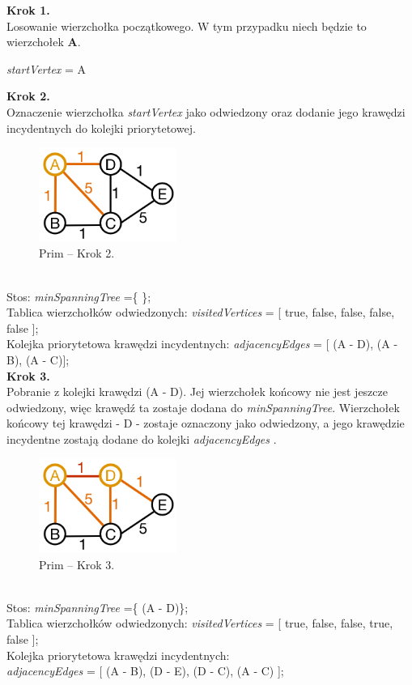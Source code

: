 \textbf{Krok 1.}\\
Losowanie wierzchołka początkowego. W tym przypadku niech będzie to wierzchołek \textbf{A}.
\begin{center}
	\emph{startVertex} = A
\end{center}

\textbf{Krok 2.}\\
Oznaczenie wierzchołka \emph{startVertex} jako odwiedzony oraz dodanie jego krawędzi incydentnych do kolejki priorytetowej. 
\begin{figure}[htb!]
	\centering
	\includegraphics[width=0.4\textwidth]{tex/fig/graf2}
	\caption{Prim -- Krok 2.}
	\label{fig: g2}
\end{figure}\\
Stos: \emph{minSpanningTree} =\{ \};\\
Tablica wierzchołków odwiedzonych: \emph{visitedVertices} = [ true, false, false, false, false ];\\
Kolejka priorytetowa krawędzi incydentnych: \emph{adjacencyEdges} = [ (A - D), (A - B), (A - C)];\\

\textbf{Krok 3.}\\
Pobranie z kolejki krawędzi (A - D). Jej wierzchołek końcowy nie jest jeszcze odwiedzony, więc krawędź ta zostaje dodana do \emph{minSpanningTree}. Wierzchołek końcowy tej krawędzi - D - zostaje oznaczony jako odwiedzony, a jego krawędzie incydentne zostają dodane do kolejki \emph{adjacencyEdges} .
\begin{figure}[htb!]
	\centering
	\includegraphics[width=0.4\textwidth]{tex/fig/graf3}
	\caption{Prim -- Krok 3.}
	\label{fig: g3}
\end{figure}\\
Stos: \emph{minSpanningTree} =\{ (A - D)\};\\
Tablica wierzchołków odwiedzonych: \emph{visitedVertices} = [ true, false, false, true, false ];\\
Kolejka priorytetowa krawędzi incydentnych:\\ \emph{adjacencyEdges} = [ (A - B), (D - E), (D - C), (A - C) ];\\

